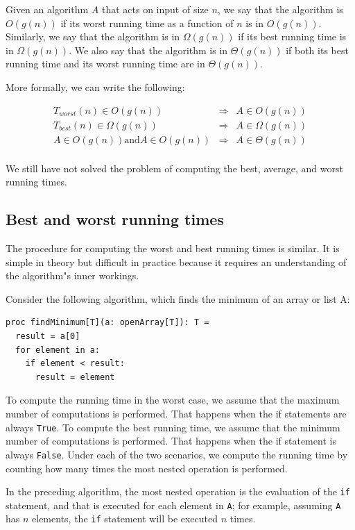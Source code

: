 \documentclass[justified, sixbynine]{tufte-book}
\def\ft{\small\tt}
\theoremstyle{plain}%
\newtheorem * {corollary}{Corollary}
\theoremstyle{definition}
\theoremstyle{remark}
\newtheorem * {remark}{Remark}
\newtheorem * {note}{Note}
\begin{document}
\begin{fullwidth}
Given an algorithm $A$ that acts on input of size $n$, we say that the algorithm is $O(g(n))$ if its worst running time as a function of $n$ is in $O(g(n))$. Similarly, we say that the algorithm is in $\Omega(g(n))$ if its best running time is in $\Omega(g(n))$. We also say that the algorithm is in $ \Theta(g(n))$ if both its best running time and its worst running time are in  $\Theta(g(n))$.

More formally, we can write the following:

\begin{eqnarray}
T_{worst}(n) \in O(g(n)) &\Rightarrow& A \in O(g(n)) \\
T_{best}(n) \in \Omega(g(n)) &\Rightarrow& A \in \Omega(g(n)) \\
A \in O(g(n)) \textrm{and} A \in O(g(n))  &\Rightarrow& A \in \Theta(g(n)) \\
\end{eqnarray}

We still have not solved the problem of computing the best, average, and worst running times.

\goodbreak\subsection{Best and worst running times}

The procedure for computing the worst and best running times is similar. It is simple in theory but difficult in practice because it requires an understanding of the algorithm"s inner workings.

Consider the following algorithm, which finds the minimum of an array or list A:
\begin{lstlisting}
proc findMinimum[T](a: openArray[T]): T =
  result = a[0]
  for element in a:
    if element < result:
      result = element
\end{lstlisting}


To compute the running time in the worst case, we assume that the maximum number of computations is performed. That happens when the if statements are always {\ft True}. To compute the best running time, we assume that the minimum number of computations is performed. That happens when the if statement is always {\ft False}.
Under each of the two scenarios, we compute the running time by counting how many times the most nested operation is performed.

In the preceding algorithm, the most nested operation is the evaluation of the {\ft if} statement, and that is executed for each element in {\ft A}; for example, assuming {\ft A} has $n$ elements, the {\ft if} statement will be executed $n$ times.


\end{fullwidth}
\end{document}
